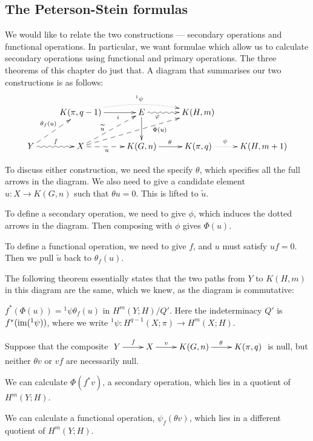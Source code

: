 \documentclass[11pt]{article}
\begin{document}
\subsection{The Peterson-Stein formulas}
We would like to relate the two constructions --- secondary operations and
functional operations. In particular, we want formulae which allow us to
calculate secondary operations using functional and primary operations. The
three theorems of this chapter do just that. A diagram that summarises our two
constructions is as follows:
\[\xymatrix{
&K(\pi,q-1)\ar[r]_{\ \ \ \ \ i}\ar@{.>}@/^.8pc/[rr]^{^1\psi}&
E\ar@{~>}[r]_{\phi\ \ \ \ \ \ \ \ \ }\ar[d]&K(H,m)\\
Y\ar@{~>}[r]^f\ar@{-->}[ru]^{\theta_f(u)}&
X\ar@{-->}[ru]^(.4){\widetilde u}
\ar@{-->}[r]_{u\ \ \ }\ar@{-->}[rru]_(.65){\Phi(u)}&
K(G,n)\ar[r]^\theta&K(\pi,q)\ar@{.>}[r]^{\psi\ \ \ \ }&
K(H,m+1)
}\]
\begin{itemise}
\item To discuss either construction, we need the specify $\theta$, which
specifies all the full arrows in the diagram. We also need to give a candidate
element $u:X\to K(G,n)$ such that $\theta u=0$. This is lifted to $\widetilde
u$.
\item To define a secondary operation, we need to give $\phi$, which induces the
dotted arrows in the diagram. Then composing with $\phi$ gives $\Phi(u)$.
\item To define a functional operation, we need to give $f$, and $u$ must
satisfy $u f=0$. Then we pull $\widetilde u$ back to $\theta_f(u)$.
\end{itemise}
The following theorem essentially states that the two paths from $Y$ to $K(H,m)$
in this diagram are the same, which we knew, as the diagram is commutative:
\begin{thm*}\label{PSfirst}
$f^*(\Phi(u))={^1\psi}\theta_f(u)$ in $H^m(Y;H)/Q'$. Here the indeterminacy $Q'$
is $f^*(\operatorname{im}({^1\psi}))$, where we write $^1\psi:H^{q-1}(X;\pi)\to H^{m}(X;H)$.
\end{thm*}
Suppose that the composite
$\xymatrix{Y\ar[r]^f&X\ar[r]^{v\ \ \ \ } &K(G,n)\ar[r]^\theta&K(\pi,q)}$
is null, but neither $\theta v$ or $vf$ are necessarily null.
\begin{itemise}
\item We can calculate $\Phi(f^*v)$, a secondary operation, which lies in a
quotient of $H^m(Y;H)$.
\item We can calculate a functional operation, $\psi_f(\theta v)$, which lies in
a different quotient of $H^m(Y;H)$.
\end{itemise}
\end{document}
